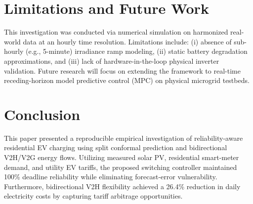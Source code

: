 \documentclass[conference]{IEEEtran}
\begin{document}
\section{Limitations and Future Work}
This investigation was conducted via numerical simulation on harmonized real-world data at an hourly time resolution. Limitations include: (i) absence of sub-hourly (e.g., 5-minute) irradiance ramp modeling, (ii) static battery degradation approximations, and (iii) lack of hardware-in-the-loop physical inverter validation. Future research will focus on extending the framework to real-time receding-horizon model predictive control (MPC) on physical microgrid testbeds.

\section{Conclusion}
This paper presented a reproducible empirical investigation of reliability-aware residential EV charging using split conformal prediction and bidirectional V2H/V2G energy flows. Utilizing measured solar PV, residential smart-meter demand, and utility EV tariffs, the proposed switching controller maintained 100\% deadline reliability while eliminating forecast-error vulnerability. Furthermore, bidirectional V2H flexibility achieved a 26.4\% reduction in daily electricity costs by capturing tariff arbitrage opportunities.



\end{document}
